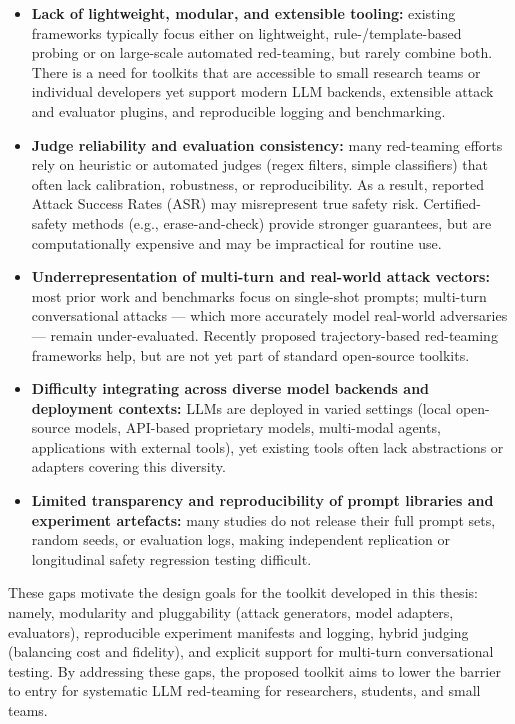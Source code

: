 \begin{itemize}
  \item \textbf{Lack of lightweight, modular, and extensible tooling:} existing frameworks typically focus either on lightweight, rule-/template-based probing or on large-scale automated red-teaming, but rarely combine both. There is a need for toolkits that are accessible to small research teams or individual developers yet support modern LLM backends, extensible attack and evaluator plugins, and reproducible logging and benchmarking.  
  \item \textbf{Judge reliability and evaluation consistency:} many red-teaming efforts rely on heuristic or automated judges (regex filters, simple classifiers) that often lack calibration, robustness, or reproducibility. As a result, reported Attack Success Rates (ASR) may misrepresent true safety risk. Certified-safety methods (e.g., erase-and-check) provide stronger guarantees, but are computationally expensive and may be impractical for routine use.  
  \item \textbf{Underrepresentation of multi-turn and real-world attack vectors:} most prior work and benchmarks focus on single-shot prompts; multi-turn conversational attacks — which more accurately model real-world adversaries — remain under-evaluated. Recently proposed trajectory-based red-teaming frameworks help, but are not yet part of standard open-source toolkits.  
  \item \textbf{Difficulty integrating across diverse model backends and deployment contexts:} LLMs are deployed in varied settings (local open-source models, API-based proprietary models, multi-modal agents, applications with external tools), yet existing tools often lack abstractions or adapters covering this diversity.  
  \item \textbf{Limited transparency and reproducibility of prompt libraries and experiment artefacts:} many studies do not release their full prompt sets, random seeds, or evaluation logs, making independent replication or longitudinal safety regression testing difficult.  
\end{itemize}

These gaps motivate the design goals for the toolkit developed in this thesis: namely, modularity and pluggability (attack generators, model adapters, evaluators), reproducible experiment manifests and logging, hybrid judging (balancing cost and fidelity), and explicit support for multi-turn conversational testing.
By addressing these gaps, the proposed toolkit aims to lower the barrier to entry for systematic LLM red-teaming for researchers, students, and small teams.

